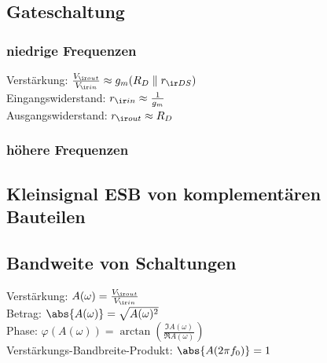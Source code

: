 \documentclass[european]{latex4ei_sheet}
\begin{document}
\begin{sectionbox}
	\subsection{Gateschaltung}
	\subsubsection{niedrige Frequenzen}
	Verstärkung: $\frac{V_{\ir out}}{V_{\ir in}} \approx g_m(R_D\parallel r_{\ir DS})$\\
	Eingangswiderstand: $r_{\ir in} \approx \frac{1}{g_m}$\\
	Ausgangswiderstand: $r_{\ir out} \approx R_D$\\
	\subsubsection{höhere Frequenzen}
	\subsection{Kleinsignal ESB von komplementären Bauteilen}
	\subsection{Bandweite von Schaltungen}
	Verstärkung: $A(\omega) = \frac{V_{\ir out}}{V_{\ir in}}$\\
	Betrag: $\abs{A(\omega)} = \sqrt{A(\omega)^2}$\\
	Phase: $\varphi(A(\omega)) = \arctan\left(\frac{\Im{A(\omega)}}{\Re{A(\omega)}}\right)$\\
	Verstärkungs-Bandbreite-Produkt: $\abs{A(2\pi f_0)} = 1$\\
\end{sectionbox}
\end{document}
